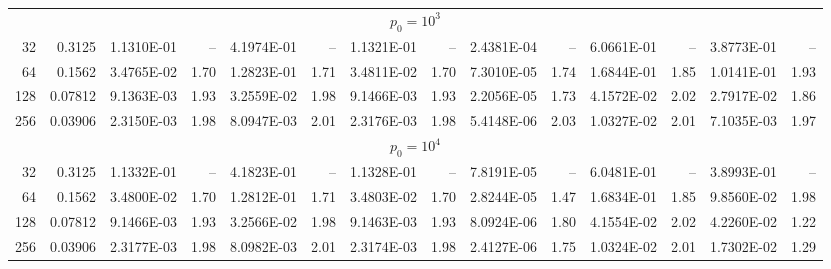 \begin{tabular}{rrrrrrrrrrrrrr}
\multicolumn{14}{c}{$p_0=10^{3}$} \\
32 & 0.3125 & 1.1310E-01 & -- & 4.1974E-01 & -- & 1.1321E-01 & -- & 2.4381E-04 & -- & 6.0661E-01 & -- & 3.8773E-01 & -- \\
64 & 0.1562 & 3.4765E-02 & 1.70 & 1.2823E-01 & 1.71 & 3.4811E-02 & 1.70 & 7.3010E-05 & 1.74 & 1.6844E-01 & 1.85 & 1.0141E-01 & 1.93 \\
128 & 0.07812 & 9.1363E-03 & 1.93 & 3.2559E-02 & 1.98 & 9.1466E-03 & 1.93 & 2.2056E-05 & 1.73 & 4.1572E-02 & 2.02 & 2.7917E-02 & 1.86 \\
256 & 0.03906 & 2.3150E-03 & 1.98 & 8.0947E-03 & 2.01 & 2.3176E-03 & 1.98 & 5.4148E-06 & 2.03 & 1.0327E-02 & 2.01 & 7.1035E-03 & 1.97 \\
\multicolumn{14}{c}{$p_0=10^{4}$} \\
32 & 0.3125 & 1.1332E-01 & -- & 4.1823E-01 & -- & 1.1328E-01 & -- & 7.8191E-05 & -- & 6.0481E-01 & -- & 3.8993E-01 & -- \\
64 & 0.1562 & 3.4800E-02 & 1.70 & 1.2812E-01 & 1.71 & 3.4803E-02 & 1.70 & 2.8244E-05 & 1.47 & 1.6834E-01 & 1.85 & 9.8560E-02 & 1.98 \\
128 & 0.07812 & 9.1466E-03 & 1.93 & 3.2566E-02 & 1.98 & 9.1463E-03 & 1.93 & 8.0924E-06 & 1.80 & 4.1554E-02 & 2.02 & 4.2260E-02 & 1.22 \\
256 & 0.03906 & 2.3177E-03 & 1.98 & 8.0982E-03 & 2.01 & 2.3174E-03 & 1.98 & 2.4127E-06 & 1.75 & 1.0324E-02 & 2.01 & 1.7302E-02 & 1.29 \\
\hline
\end{tabular}
